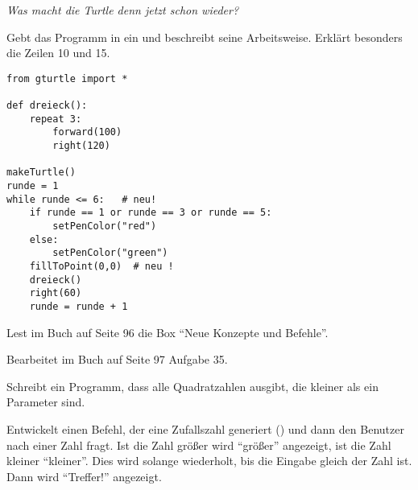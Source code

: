\documentclass[10pt, a4paper]{arbeitsblatt}
\begin{document}
\ReiheTitel

\begin{aufgabe}[icon=\iconComputer\,\iconPartner]
\vspace*{-1em}
\begin{center}
	\emph{Was macht die Turtle denn jetzt schon wieder?}
\end{center}

Gebt das Programm in  ein und beschreibt seine
Arbeitsweise. Erklärt besonders die Zeilen 10 und 15.

\begin{verbatim}
from gturtle import *

def dreieck():
	repeat 3:
		forward(100)
		right(120)

makeTurtle()
runde = 1
while runde <= 6:   # neu!
	if runde == 1 or runde == 3 or runde == 5:
		setPenColor("red")
	else:
		setPenColor("green")
	fillToPoint(0,0)  # neu !
	dreieck()
	right(60)
	runde = runde + 1
\end{verbatim}
\end{aufgabe}

\begin{aufgabe}[icon=\iconBuch\,\iconComputer\,\iconPartner]
\begin{teilaufgaben}
	\teilaufgabe
	Lest im Buch auf Seite 96 die Box \enquote{Neue Konzepte und Befehle}.

	\teilaufgabe
	Bearbeitet im Buch auf Seite 97 Aufgabe 35.

	\teilaufgabe
	Schreibt ein Programm, dass alle Quadratzahlen ausgibt, die kleiner als ein
	Parameter  sind.

	\teilaufgabe
	Entwickelt einen Befehl, der eine Zufallszahl generiert ()
	und dann den Benutzer nach einer Zahl fragt. Ist die Zahl größer wird
	\enquote{größer} angezeigt, ist die Zahl kleiner \enquote{kleiner}.
	Dies wird solange wiederholt, bis die Eingabe gleich der Zahl ist. Dann wird
	\enquote{Treffer!} angezeigt.
\end{teilaufgaben}
\end{aufgabe}

\vspace*{-1em}
\end{document}
